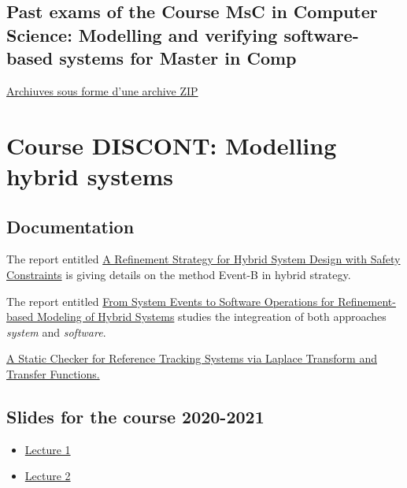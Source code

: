 \documentclass[ 12pt]{article}
\begin{document}
\subsection{Past exams  of  the  Course MsC in Computer Science: Modelling and verifying software-based systems for Master in Comp}
\label{sec:past-exams-course}


\href{http://mery54.github.io/teaching/mosos/lecturesnotes/annales-master2425.zip}{Archiuves
sous forme d'une archive ZIP}


\hrulefill




\section{Course DISCONT: Modelling hybrid systems}
\label{sec:course-discont}


\subsection{Documentation}
\label{sec:documentation}



The report entitled \href{https://inria.hal.science/hal-02895528v1
}{A Refinement Strategy for Hybrid System Design with Safety
  Constraints} is giving details on the method Event-B in hybrid
strategy.


The report entitled 
\href{https://hal.science/hal-04189025v2
}{From System Events to Software Operations for Refinement-based
  Modeling of Hybrid Systems}  studies the integreation of both
approaches  \textit{system} and \textit{software}.


\href{https://hal.science/hal-04152829v1
  }{A Static Checker for Reference Tracking Systems via Laplace Transform and Transfer Functions.}





\subsection{Slides for the course 2020-2021}

\begin{itemize}
\item[]  
  \href{http://mery54.github.io/teaching/mosos/lecturesnotes/2021-01-MLS-00.pdf}{Lecture
    1 }
\item[]  
  \href{http://mery54.github.io/teaching/mosos/lecturesnotes/2021-01-MLS-01.pdf}{Lecture
    2 }
\end{itemize}
\end{document}
